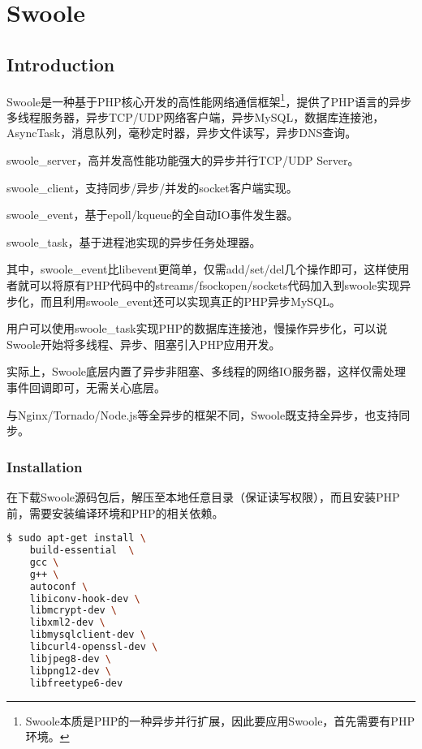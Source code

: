 \part{Swoole}



\chapter{Introduction}


Swoole是一种基于PHP核心开发的高性能网络通信框架\footnote{Swoole本质是PHP的一种异步并行扩展，因此要应用Swoole，首先需要有PHP环境。}，提供了PHP语言的异步多线程服务器，异步TCP/UDP网络客户端，异步MySQL，数据库连接池，AsyncTask，消息队列，毫秒定时器，异步文件读写，异步DNS查询。

\begin{compactitem}
\item swoole\_server，高并发高性能功能强大的异步并行TCP/UDP Server。
\item swoole\_client，支持同步/异步/并发的socket客户端实现。
\item swoole\_event，基于epoll/kqueue的全自动IO事件发生器。
\item swoole\_task，基于进程池实现的异步任务处理器。
\end{compactitem}

其中，swoole\_event比libevent更简单，仅需add/set/del几个操作即可，这样使用者就可以将原有PHP代码中的streams/fsockopen/sockets代码加入到swoole实现异步化，而且利用swoole\_event还可以实现真正的PHP异步MySQL。

用户可以使用swoole\_task实现PHP的数据库连接池，慢操作异步化，可以说Swoole开始将多线程、异步、阻塞引入PHP应用开发。

实际上，Swoole底层内置了异步非阻塞、多线程的网络IO服务器，这样仅需处理事件回调即可，无需关心底层。

与Nginx/Tornado/Node.js等全异步的框架不同，Swoole既支持全异步，也支持同步。

\section{Installation}

在下载Swoole源码包后，解压至本地任意目录（保证读写权限），而且安装PHP前，需要安装编译环境和PHP的相关依赖。

\begin{lstlisting}[language=bash]
$ sudo apt-get install \
	build-essential  \
	gcc \
	g++ \
	autoconf \
	libiconv-hook-dev \
	libmcrypt-dev \
	libxml2-dev \
	libmysqlclient-dev \
	libcurl4-openssl-dev \
	libjpeg8-dev \
	libpng12-dev \
	libfreetype6-dev
\end{lstlisting}

